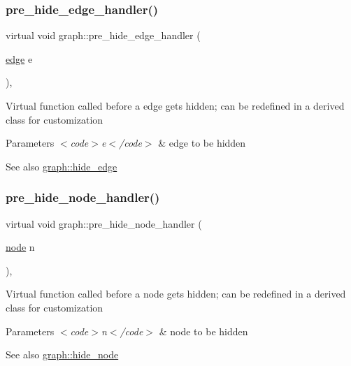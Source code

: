 \subsubsection{\texorpdfstring{pre\+\_\+hide\+\_\+edge\+\_\+handler()}{pre\_hide\_edge\_handler()}}
{\footnotesize\ttfamily virtual void graph\+::pre\+\_\+hide\+\_\+edge\+\_\+handler (\begin{DoxyParamCaption}\item[{\mbox{\hyperlink{classedge}{edge}}}]{e }\end{DoxyParamCaption})\hspace{0.3cm}{\ttfamily [inline]}, {\ttfamily [virtual]}}

Virtual function called before a edge gets hidden; can be redefined in a derived class for customization


\begin{DoxyParams}{Parameters}
{\em $<$code$>$e$<$/code$>$} & edge to be hidden \\
\hline
\end{DoxyParams}
\begin{DoxySeeAlso}{See also}
\mbox{\hyperlink{classgraph_ab2f8520bcac080d73c55228fecc61825}{graph\+::hide\+\_\+edge}} 
\end{DoxySeeAlso}
\mbox{\label{classgraph_a96e6fadc8e77bde74448d4ba4b873628}} 
\subsubsection{\texorpdfstring{pre\+\_\+hide\+\_\+node\+\_\+handler()}{pre\_hide\_node\_handler()}}
{\footnotesize\ttfamily virtual void graph\+::pre\+\_\+hide\+\_\+node\+\_\+handler (\begin{DoxyParamCaption}\item[{\mbox{\hyperlink{classnode}{node}}}]{n }\end{DoxyParamCaption})\hspace{0.3cm}{\ttfamily [inline]}, {\ttfamily [virtual]}}

Virtual function called before a node gets hidden; can be redefined in a derived class for customization


\begin{DoxyParams}{Parameters}
{\em $<$code$>$n$<$/code$>$} & node to be hidden \\
\hline
\end{DoxyParams}
\begin{DoxySeeAlso}{See also}
\mbox{\hyperlink{classgraph_a4f0177ffe8eaddd9c5bec73078bed873}{graph\+::hide\+\_\+node}} 
\end{DoxySeeAlso}
\mbox{\label{classgraph_a505198f412b1e426e9d09b62ea9811e8}} 
